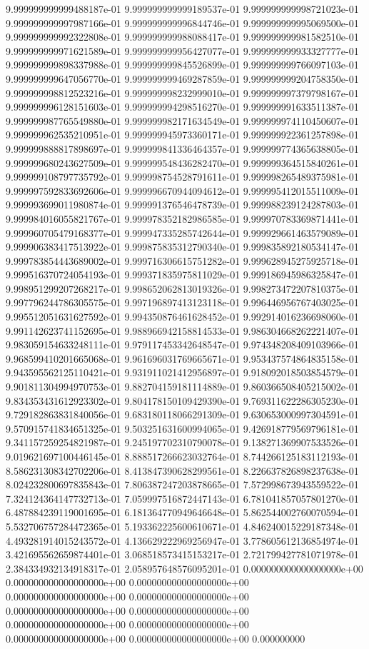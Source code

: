9.999999999999488187e-01	9.999999999999189537e-01	9.999999999998721023e-01	9.999999999997987166e-01	9.999999999996844746e-01	9.999999999995069500e-01	9.999999999992322808e-01	9.999999999988088417e-01	9.999999999981582510e-01	9.999999999971621589e-01	9.999999999956427077e-01	9.999999999933327777e-01	9.999999999898337988e-01	9.999999999845526899e-01	9.999999999766097103e-01	9.999999999647056770e-01	9.999999999469287859e-01	9.999999999204758350e-01	9.999999998812523216e-01	9.999999998232999010e-01	9.999999997379798167e-01	9.999999996128151603e-01	9.999999994298516270e-01	9.999999991633511387e-01	9.999999987765549880e-01	9.999999982171634549e-01	9.999999974110450607e-01	9.999999962535210951e-01	9.999999945973360171e-01	9.999999922361257898e-01	9.999999888817898697e-01	9.999999841336464357e-01	9.999999774365638805e-01	9.999999680243627509e-01	9.999999548436282470e-01	9.999999364515840261e-01	9.999999108797735792e-01	9.999998754528791611e-01	9.999998265489375981e-01	9.999997592833692606e-01	9.999996670944094612e-01	9.999995412015511009e-01	9.999993699011980874e-01	9.999991376546478739e-01	9.999988239124287803e-01	9.999984016055821767e-01	9.999978352182986585e-01	9.999970783369871441e-01	9.999960705479168377e-01	9.999947335285742644e-01	9.999929661463579089e-01	9.999906383417513922e-01	9.999875835312790340e-01	9.999835892180534147e-01	9.999783854443689002e-01	9.999716306615751282e-01	9.999628945275925718e-01	9.999516370724054193e-01	9.999371835975811029e-01	9.999186945986325847e-01	9.998951299207268217e-01	9.998652062813019326e-01	9.998273472207810375e-01	9.997796244786305575e-01	9.997196897413123118e-01	9.996446956767403025e-01	9.995512051631627592e-01	9.994350876461628452e-01	9.992914016236698060e-01	9.991142623741152695e-01	9.988966942158814533e-01	9.986304668262221407e-01	9.983059154633248111e-01	9.979117453342648547e-01	9.974348208409103966e-01	9.968599410201665068e-01	9.961696031769665671e-01	9.953437574864835158e-01	9.943595562125110421e-01	9.931911021412956897e-01	9.918092018503854579e-01	9.901811304994970753e-01	9.882704159181114889e-01	9.860366508405215002e-01	9.834353431612923302e-01	9.804178150109429390e-01	9.769311622286305230e-01	9.729182863831840056e-01	9.683180118066291309e-01	9.630653000997304591e-01	9.570915741834651325e-01	9.503251631600994065e-01	9.426918779569796181e-01	9.341157259254821987e-01	9.245197702310790078e-01	9.138271369907533526e-01	9.019621697100446145e-01	8.888517266623032764e-01	8.744266125183112193e-01	8.586231308342702206e-01	8.413847390628299561e-01	8.226637826898237638e-01	8.024232800697835843e-01	7.806387247203878665e-01	7.572998673943559522e-01	7.324124364147732713e-01	7.059997516872447143e-01	6.781041857057801270e-01	6.487884239119001695e-01	6.181364770949646648e-01	5.862544002760070594e-01	5.532706757284472365e-01	5.193362225600610671e-01	4.846240015229187348e-01	4.493281914015243572e-01	4.136629222969256947e-01	3.778605612136854974e-01	3.421695562659874401e-01	3.068518573415153217e-01	2.721799427781071978e-01	2.384334932134918317e-01	2.058957648576095201e-01	0.000000000000000000e+00	0.000000000000000000e+00	0.000000000000000000e+00	0.000000000000000000e+00	0.000000000000000000e+00	0.000000000000000000e+00	0.000000000000000000e+00	0.000000000000000000e+00	0.000000000000000000e+00	0.000000000000000000e+00	0.000000000000000000e+00	0.000000000